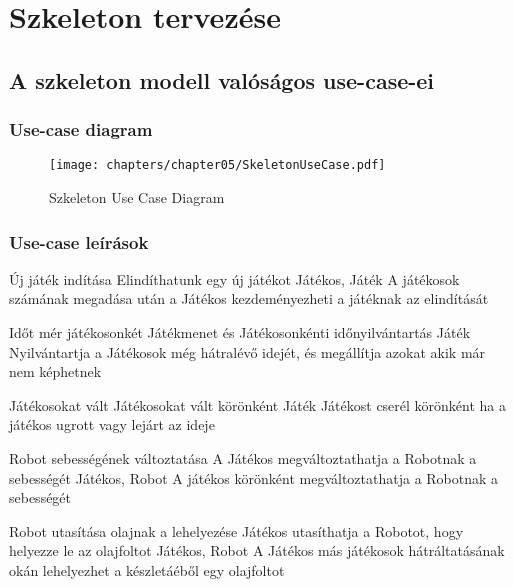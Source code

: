 %
\chapter{Szkeleton tervezése}

\thispagestyle{fancy}

\section{A szkeleton modell valóságos use-case-ei}


\subsection{Use-case diagram}

\begin{figure}[h]
\begin{center}
\texttt{[image: chapters/chapter05/SkeletonUseCase.pdf]}
\caption{Szkeleton Use Case Diagram}
\label{fig:SzkeletonUseCase}
\end{center}
\end{figure}

\subsection{Use-case leírások}

\usecase%
{Új játék indítása}%
{Elindíthatunk egy új játékot}%
{Játékos, Játék}%
{A játékosok számának megadása után a Játékos kezdeményezheti a játéknak az elindítását}

\usecase%
{Időt mér játékosonkét}%
{Játékmenet és Játékosonkénti időnyilvántartás}%
{Játék}%
{Nyilvántartja a Játékosok még hátralévő idejét, és megállítja azokat akik már nem képhetnek}

\usecase%
{Játékosokat vált}%
{Játékosokat vált körönként}%
{Játék}%
{Játékost cserél körönként ha a játékos ugrott vagy lejárt az ideje}

\usecase%
{Robot sebességének változtatása}%
{A Játékos megváltoztathatja a Robotnak a sebességét}%
{Játékos, Robot}%
{A játékos körönként megváltoztathatja a Robotnak a sebességét}

\usecase%
{Robot utasítása olajnak a lehelyezése}%
{Játékos utasíthatja a Robotot, hogy helyezze le az olajfoltot}%
{Játékos, Robot}%
{A Játékos más játékosok hátráltatásának okán lehelyezhet a készletáéből egy olajfoltot}

